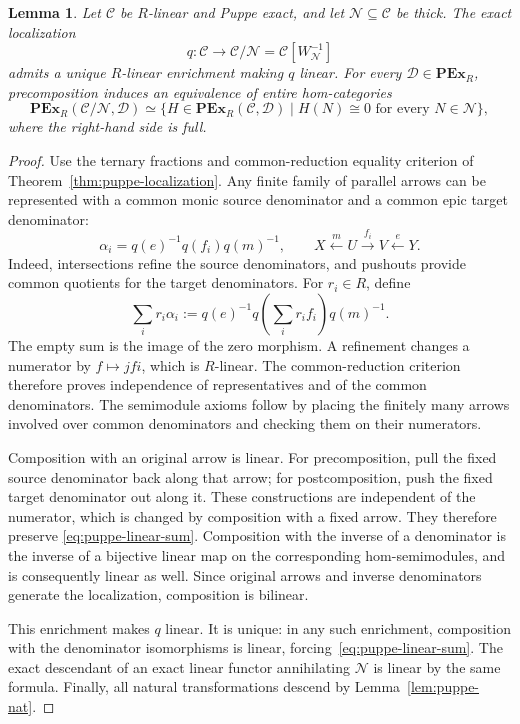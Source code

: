 \documentclass[11pt,reqno,a4paper]{amsart}
\newtheorem{lemma}[theorem]{Lemma}
\theoremstyle{definition}
\theoremstyle{remark}
\newcommand{\C}{\mathcal{C}}
\newcommand{\D}{\mathcal{D}}
\newcommand{\N}{\mathcal{N}}
\newcommand{\0}{\mathbf{0}}
\renewcommand{\1}{\mathbf{1}}
\newcommand{\iso}{\cong}
\begin{document}
\begin{lemma}\label{lem:puppe-linear-localization}
Let $\C$ be $R$-linear and Puppe exact, and let
$\N\subseteq\C$ be thick. The exact localization
\[
 q:\C\longrightarrow\C/\N=\C[W_{\N}^{-1}]
\]
admits a unique $R$-linear enrichment making $q$ linear.
For every $\D\in\mathbf{PEx}_{R}$, precomposition induces
an equivalence of entire hom-categories
\[
 \mathbf{PEx}_{R}(\C/\N,\D)\simeq
 \{H\in\mathbf{PEx}_{R}(\C,\D)
      \mid H(N)\iso0\text{ for every }N\in\N\},
\]
where the right-hand side is full.
\end{lemma}
\begin{proof}
Use the ternary fractions and common-reduction equality
criterion of Theorem~\ref{thm:puppe-localization}. Any finite
family of parallel arrows can be represented with a common
monic source denominator and a common epic target denominator:
\[
 \alpha_i=q(e)^{-1}q(f_i)q(m)^{-1},\qquad
 X\xleftarrow{m}U\xrightarrow{f_i}V\xleftarrow{e}Y.
\]
Indeed, intersections refine the source denominators, and
pushouts provide common quotients for the target denominators.
For $r_i\in R$, define
\begin{equation}\label{eq:puppe-linear-sum}
 \sum_i r_i\alpha_i
 :=q(e)^{-1}q\!\left(\sum_i r_i f_i\right)q(m)^{-1}.
\end{equation}
The empty sum is the image of the zero morphism. A refinement
changes a numerator by $f\mapsto jfi$, which is $R$-linear.
The common-reduction criterion therefore proves independence
of representatives and of the common denominators. The
semimodule axioms follow by placing the finitely many arrows
involved over common denominators and checking them on their
numerators.

Composition with an original arrow is linear. For
precomposition, pull the fixed source denominator back along
that arrow; for postcomposition, push the fixed target
denominator out along it. These constructions are independent
of the numerator, which is changed by composition with a
fixed arrow. They therefore preserve
\eqref{eq:puppe-linear-sum}. Composition with the inverse of
a denominator is the inverse of a bijective linear map on
the corresponding hom-semimodules, and is consequently linear
as well. Since original arrows and inverse denominators
generate the localization, composition is bilinear.

This enrichment makes $q$ linear. It is unique: in any such
enrichment, composition with the denominator isomorphisms is
linear, forcing~\eqref{eq:puppe-linear-sum}. The exact
descendant of an exact linear functor annihilating $\N$ is
linear by the same formula. Finally, all natural
transformations descend by Lemma~\ref{lem:puppe-nat}.
\end{proof}
\end{document}
